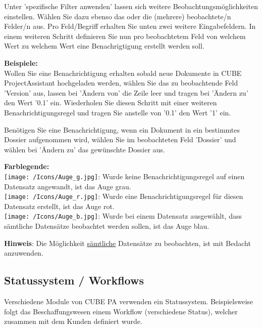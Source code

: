Unter 'spezifische Filter anwenden' lassen sich weitere Beobachtungsmöglichkeiten einstellen. Wählen Sie dazu ebenso das oder die (mehrere) beobachtete/n Felder/n aus. Pro Feld/Begriff erhalten Sie unten zwei weitere Eingabefeldern. In einem weiteren Schritt definieren Sie nun pro beobachtetem Feld von welchem Wert zu welchem Wert eine Benachrigtigung erstellt werden soll.

\vspace{\baselineskip}

\textbf{Beispiele:} \\
Wollen Sie eine Benachrichtigung erhalten sobald neue Dokumente in CUBE ProjectAssistant hochgeladen werden, wählen Sie das zu beobachtende Feld 'Version' aus, lassen bei 'Ändern von' die Zeile leer und tragen bei 'Ändern zu' den Wert '0.1' ein. Wiederholen Sie diesen Schritt mit einer weiteren Benachrichtigungsregel und tragen Sie anstelle von '0.1' den Wert '1' ein.

\vspace{\baselineskip}

Benötigen Sie eine Benachrichtigung, wenn ein Dokument in ein bestimmtes Dossier aufgenommen wird, wählen Sie im beobachteten Feld 'Dossier' und wählen bei 'Ändern zu' das gewünschte Dossier aus.

\pagebreak
\textbf{Farblegende:}\\
\texttt{[image: /Icons/Auge\_g.jpg]}: Wurde keine Benachrichtigungsregel auf einen Datensatz angewandt, ist das Auge grau.\\
\texttt{[image: /Icons/Auge\_r.jpg]}: Wurde eine Benachrichtigungsregel für diesen Datensatz erstellt, ist das Auge rot.\\
\texttt{[image: /Icons/Auge\_b.jpg]}: Wurde bei einem Datensatz ausgewählt, dass sämtliche Datensätze beobachtet werden sollen, ist das Auge blau.

\vspace{\baselineskip}

\textbf{Hinweis}: Die Möglichkeit \underline{sämtliche} Datensätze zu beobachten, ist mit Bedacht anzuwenden.

\subsection{Statussystem / Workflows} %
\label{bkm:Ref2018073101}

Verschiedene Module von CUBE PA verwenden ein Statussystem. Beispielsweise folgt das Beschaffungswesen einem Workflow (verschiedene Status), welcher zusammen mit dem Kunden definiert wurde.

